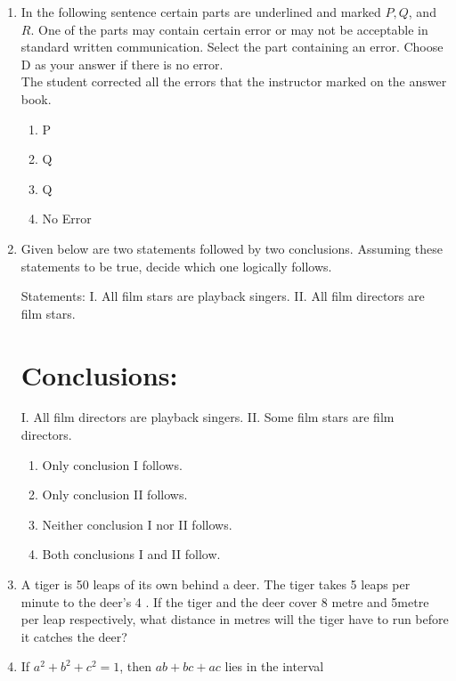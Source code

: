 \documentclass[journal]{IEEEtran}
\begin{document}
\begin{enumerate}
\item In the following sentence certain parts are underlined and marked $P, Q$, and $R$. One of the parts may contain certain error or may not be acceptable in standard written communication. Select the part containing an error. Choose D as your answer if there is no error.\\
The student corrected all the errors that the instructor marked on the answer book.
 \hfill{}
   \begin{multicols}{4}
			\begin{enumerate}
   \item P
\item  Q
\item Q
\item  No Error
\end{enumerate}
		\end{multicols}
  \item  Given below are two statements followed by two conclusions. Assuming these statements to be true, decide which one logically follows.
  

Statements:
I. All film stars are playback singers.
II. All film directors are film stars.

\section*{Conclusions:}
I. All film directors are playback singers.
II. Some film stars are film directors.
 \hfill{}
\begin{enumerate}
    
\item  Only conclusion I follows.
  \item  Only conclusion II follows.
\item  Neither conclusion I nor II follows.
 \item  Both conclusions I and II follow.
\end{enumerate}

  \item   A tiger is 50 leaps of its own behind a deer. The tiger takes 5 leaps per minute to the deer's 4 . If the tiger and the deer cover 8 metre and 5metre per leap respectively, what distance in metres will the tiger have to run before it catches the deer?
  \hfill{}
 \item If $a^{2}+b^{2}+c^{2}=1$, then $a b+b c+a c$ lies in the interval
 \hfill{}
  \begin{multicols}{4}
      

\end{multicols}
\end{enumerate}
\end{document}

